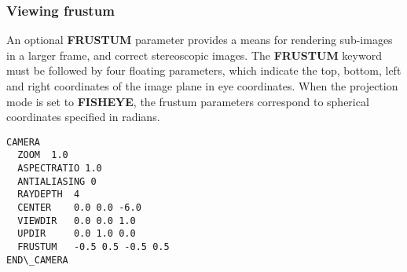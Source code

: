 \subsubsection{Viewing frustum}
An optional {\bf FRUSTUM} parameter provides a means for rendering sub-images
in a larger frame, and correct stereoscopic images.  The {\bf FRUSTUM}
keyword must be followed by four floating parameters, which indicate
the top, bottom, left and right coordinates of the image plane in 
eye coordinates.   When the projection mode is set to {\bf FISHEYE},
the frustum parameters correspond to spherical coordinates specified
in radians.

\begin{verbatim}
CAMERA
  ZOOM  1.0
  ASPECTRATIO 1.0
  ANTIALIASING 0
  RAYDEPTH  4
  CENTER    0.0 0.0 -6.0
  VIEWDIR   0.0 0.0 1.0
  UPDIR     0.0 1.0 0.0
  FRUSTUM   -0.5 0.5 -0.5 0.5
END\_CAMERA
\end{verbatim}


